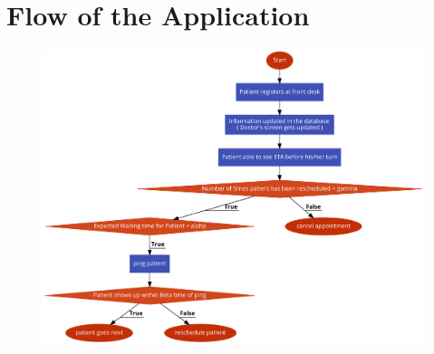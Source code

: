 \documentclass{article}
\begin{document}
\section*{Flow of the Application}

\begin{figure}[h]
	\begin{center}
		\includegraphics[scale=0.25]{workFlow.png} 
	\end{center}
\end{figure}	
\end{document}
